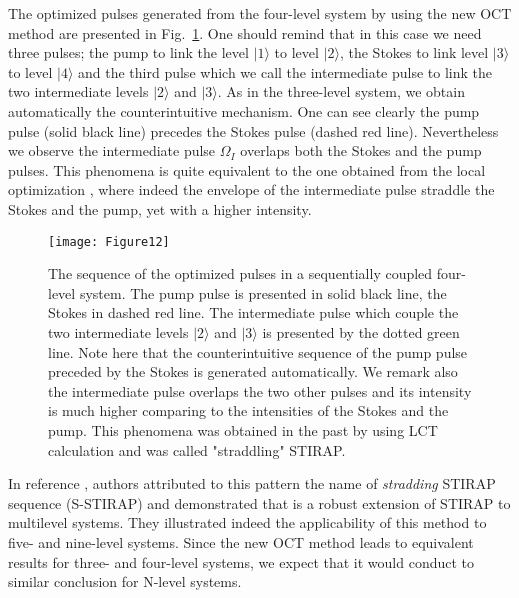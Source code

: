 \documentclass[]{interact}
\theoremstyle{plain}%
\theoremstyle{definition}
\theoremstyle{remark}
\begin{document}
The optimized pulses generated from the four-level system by using the new OCT 
method are presented in Fig.~\ref{Fig:pulse_four_octnew}. One should remind 
that in this case we need three pulses; the pump to link the level $|1\rangle$ 
to level $|2\rangle$, the Stokes to link level $|3\rangle$to level $|4\rangle$ 
and the third pulse which we call the intermediate pulse to link the two 
intermediate levels $|2\rangle$ and $|3\rangle$. 
As in the three-level system, we obtain automatically the counterintuitive 
mechanism. One can see clearly the pump pulse (solid black line) precedes the 
Stokes pulse (dashed red line). Nevertheless we observe the intermediate pulse 
$\Omega_I$ overlaps both the Stokes and the pump pulses. This phenomena is 
quite equivalent to the one obtained from the local optimization \cite{Tannor}, 
where indeed the envelope of the intermediate pulse straddle the Stokes and the 
pump, yet with a higher intensity.
\begin{figure}[h!]
\centering
\texttt{[image: Figure12]}
\caption{The sequence of the optimized pulses in a sequentially coupled 
four-level system. The pump pulse is presented in solid black line, the Stokes 
in dashed red line. The intermediate pulse which couple the two intermediate 
levels $|2\rangle$ and $|3\rangle$ is presented by the dotted green line. Note 
here that the counterintuitive sequence of the pump pulse preceded by the 
Stokes is generated automatically. We remark also the intermediate pulse 
overlaps the two other pulses and its intensity is much higher comparing to the 
intensities of the Stokes and the pump. This phenomena was obtained in the past 
by using LCT calculation and was called "straddling" STIRAP.
\label{Fig:pulse_four_octnew}}
\end{figure}
\skip 0.2in
In reference \cite{Tannor}, authors attributed to this pattern the name of 
\textit{stradding} STIRAP sequence (S-STIRAP) and demonstrated that is a 
robust extension of STIRAP to multilevel systems. They illustrated indeed the 
applicability of this method to five- and nine-level systems. Since the new 
OCT method leads to equivalent results for three- and four-level systems, we 
expect that it would conduct to similar conclusion for N-level systems.  

\end{document}
